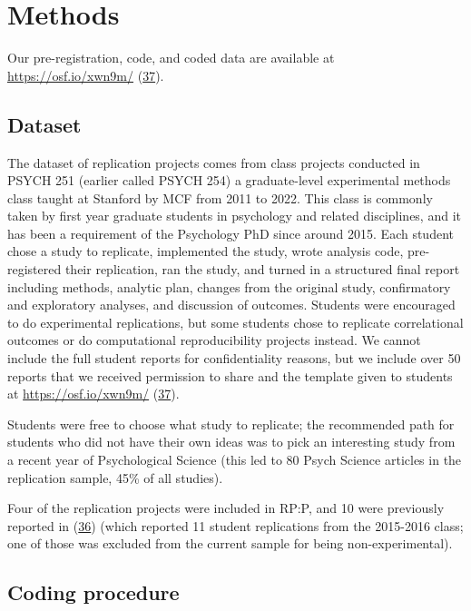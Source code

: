 \documentclass[
  english,
  a4paper,
]{article}
\begin{document}
\hypertarget{methods}{%
\section{Methods}\label{methods}}

Our pre-registration, code, and coded data are available at \url{https://osf.io/xwn9m/} (\protect\hyperlink{ref-osfdata}{37}).

\hypertarget{dataset}{%
\subsection{Dataset}\label{dataset}}

The dataset of replication projects comes from class projects conducted in PSYCH 251 (earlier called PSYCH 254) a graduate-level experimental methods class taught at Stanford by MCF from 2011 to 2022. This class is commonly taken by first year graduate students in psychology and related disciplines, and it has been a requirement of the Psychology PhD since around 2015. Each student chose a study to replicate, implemented the study, wrote analysis code, pre-registered their replication, ran the study, and turned in a structured final report including methods, analytic plan, changes from the original study, confirmatory and exploratory analyses, and discussion of outcomes. Students were encouraged to do experimental replications, but some students chose to replicate correlational outcomes or do computational reproducibility projects instead. We cannot include the full student reports for confidentiality reasons, but we include over 50 reports that we received permission to share and the template given to students at \url{https://osf.io/xwn9m/} (\protect\hyperlink{ref-osfdata}{37}).

Students were free to choose what study to replicate; the recommended path for students who did not have their own ideas was to pick an interesting study from a recent year of Psychological Science (this led to 80 Psych Science articles in the replication sample, 45\% of all studies).

Four of the replication projects were included in RP:P, and 10 were previously reported in (\protect\hyperlink{ref-hawkins2018}{36}) (which reported 11 student replications from the 2015-2016 class; one of those was excluded from the current sample for being non-experimental).

\hypertarget{coding-procedure}{%
\subsection{Coding procedure}\label{coding-procedure}}
\end{document}
